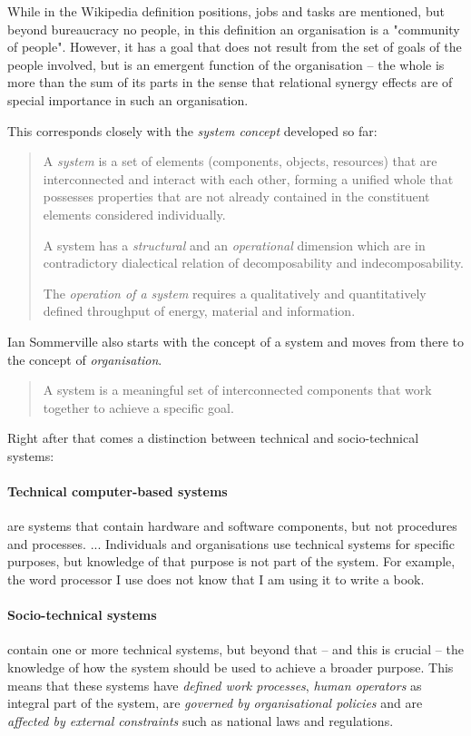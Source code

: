 \documentclass[11pt,a4paper]{article}
\begin{document}
While in the Wikipedia definition positions, jobs and tasks are mentioned, but
beyond bureaucracy no people, in this definition an organisation is a
"community of people". However, it has a goal that does not result from the
set of goals of the people involved, but is an emergent function of the
organisation -- the whole is more than the sum of its parts in the sense that
relational synergy effects are of special importance in such an organisation.

This corresponds closely with the \emph{system concept} developed so far:
\begin{quote}
  A \emph{system} is a set of elements (components, objects, resources) that
  are interconnected and interact with each other, forming a unified whole
  that possesses properties that are not already contained in the constituent
  elements considered individually.

  A system has a \emph{structural} and an \emph{operational} dimension which
  are in contradictory dialectical relation of decomposability and
  indecomposability.

  The \emph{operation of a system} requires a qualitatively and quantitatively
  defined throughput of energy, material and information.
\end{quote}

Ian Sommerville \cite{Sommerville2015} also starts with the concept of a
system and moves from there to the concept of \emph{organisation}.
\begin{quote}
  A system is a meaningful set of interconnected components that work together
  to achieve a specific goal.  \cite{Sommerville2015}
\end{quote}
Right after that comes a distinction between technical and socio-technical
systems:

\paragraph{Technical computer-based systems}
are systems that contain hardware and software components, but not procedures
and processes. ... Individuals and organisations use technical systems for
specific purposes, but knowledge of that purpose is not part of the system.
For example, the word processor I use does not know that I am using it to
write a book.

\paragraph{Socio-technical systems}
contain one or more technical systems, but beyond that -- and this is crucial
-- the knowledge of how the system should be used to achieve a broader
purpose.  This means that these systems have \emph{defined work processes},
\emph{human operators} as integral part of the system, are \emph{governed by
  organisational policies} and are \emph{affected by external constraints}
such as national laws and regulations.
\end{document}
